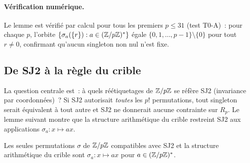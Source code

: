\documentclass[12pt,a4paper]{article}
\begin{document}
\paragraph{Vérification numérique.}
Le lemme est vérifié par calcul pour tous les premiers $p \leq 31$
(test T0-A)~: pour chaque $p$, l'orbite
$\{\sigma_a(\{r\}) : a \in (\mathbb{Z}/p\mathbb{Z})^*\}$ égale
$\{0, 1, \ldots, p-1\} \setminus \{0\}$ pour tout $r \neq 0$,
confirmant qu'aucun singleton non nul n'est fixe.

\subsection{De SJ2 à la règle du crible}
\label{sec:ch25_sj2_sieve}

La question centrale est~: à quels réétiquetages de $\mathbb{Z}/p\mathbb{Z}$ se
réfère SJ2 (invariance par coordonnées)~? Si SJ2 autorisait
\emph{toutes} les $p!$ permutations, tout singleton serait
équivalent à tout autre et SJ2 ne donnerait aucune contrainte sur
$R_p$. Le lemme suivant montre que la structure arithmétique du
crible restreint SJ2 aux applications $\sigma_a : x \mapsto ax$.

\begin{lemme}
\label{lem:lifting_forces_sigma_a}
Les seules permutations $\sigma$ de $\mathbb{Z}/p\mathbb{Z}$ compatibles avec SJ2 et
la structure arithmétique du crible sont $\sigma_a : x \mapsto ax$
pour $a \in (\mathbb{Z}/p\mathbb{Z})^*$.
\end{lemme}
\end{document}
